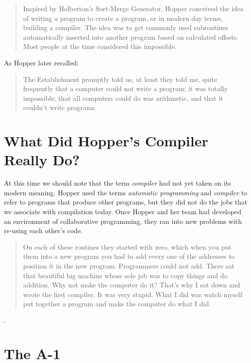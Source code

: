 \begin{quotation}
Inspired by Holberton's Sort-Merge Generator, Hopper conceived the idea of writing a 
program to create a program, or in modern day terms, building a compiler. 
The idea was to get commonly used subroutines automatically inserted into another program based on calculated offsets. 
Most people at the time considered this impossible.
\cite{women_in_computing_history_2002}
\end{quotation}

As Hopper later recalled:
\begin{quotation}
The Establishment promptly told us, at least they told me, quite frequently that a
computer could not write a program; it was totally impossible; that all computers
could do was arithmetic, and that it couldn't write programs.
\cite{hopl_keynote}
\end{quotation}

\section{What Did Hopper's Compiler Really Do?}

At this time we should note that the term \textit{compiler} had not yet taken on its modern meaning.
Hopper used the terms \textit{automatic programming} and \textit{compiler} to refer to programs
that produce other programs, but they did not do the jobs that we associate with compilation today.
Once Hopper and her team had developed an environment of collaborative programming, they
ran into new problems with re-using each other's code.

\begin{quotation}
On each of these routines they started with zero, which when you put them into 
a new program you had to add every one of the addresses to position it in the 
new program. Programmers could not add.  There sat that beautiful big machine 
whose sole job was to copy things and do addition. Why not make the computer do 
it? That's why I sat down and wrote the first compiler. It was very stupid. 
What I did was watch myself put together a program and make the computer do 
what I did. 
\cite{Hopper_1980_Oral_History}
\end{quotation}


.
\section{The A-1}


